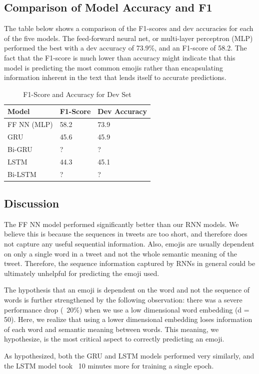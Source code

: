 \documentclass[11pt,a4paper]{article}
\begin{document}
\subsection{Comparison of Model Accuracy and F1}
The table below shows a comparison of the F1-scores and dev accuracies for each of the five models. The feed-forward neural net, or multi-layer perceptron (MLP) performed the best with a dev accuracy of 73.9\%, and an F1-score of 58.2. The fact that the F1-score is much lower than accuracy might indicate that this model is predicting the most common emojis rather than encapsulating information inherent in the text that lends itself to accurate predictions.
	\begin{table}[htp]
		\centering
		\caption{F1-Score and Accuracy for Dev Set}
		\label{my-label}
		\begin{tabular}{@{}lll@{}}
			\toprule
			Model       & F1-Score & Dev Accuracy \\ \midrule
			FF NN (MLP) & 58.2     & 73.9         \\
			GRU         & 45.6     & 45.9         \\
			Bi-GRU      & ?        & ?            \\
			LSTM        & 44.3     & 45.1         \\
			Bi-LSTM     & ?        & ?            \\ \bottomrule
		\end{tabular}
	\end{table}

\subsection{Discussion}
	The FF NN model performed significantly better than our RNN models. We believe this is because the sequences in tweets are too short, and therefore does not capture any useful sequential information. Also, emojis are usually dependent on only a single word in a tweet and not the whole semantic meaning of the tweet. Therefore, the sequence information captured by RNNs in general could be ultimately unhelpful for predicting the emoji used.
	\par
	The hypothesis that an emoji is dependent on the word and not the sequence of words is further strengthened by the following observation: there was a severe performance drop (~20\%) when we use a low dimensional word embedding (d = 50). Here, we realize that using a lower dimensional embedding loses information of each word and semantic meaning between words. This meaning, we hypothesize, is the most critical aspect to correctly predicting an emoji.
	\par
	As hypothesized, both the GRU and LSTM models performed very similarly, and the LSTM model took ~10 minutes more for training a single epoch. 
	
\end{document}
